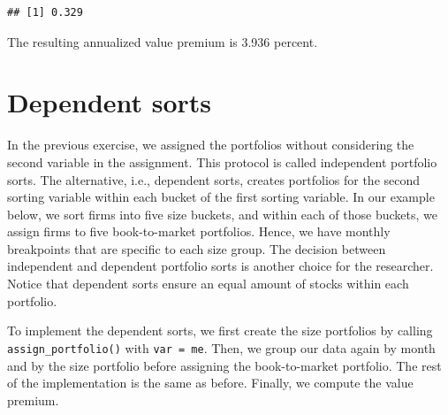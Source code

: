 \documentclass[
]{book}
\newenvironment{Shaded}{\begin{snugshade}}{\end{snugshade}}
\newcommand{\AttributeTok}[1]{\textcolor[rgb]{0.61,0.61,0.61}{#1}}
\newcommand{\DecValTok}[1]{\textcolor[rgb]{0.06,0.06,0.06}{#1}}
\newcommand{\ErrorTok}[1]{\textcolor[rgb]{0.14,0.14,0.14}{\textbf{#1}}}
\newcommand{\FunctionTok}[1]{\textcolor[rgb]{0,0,0}{#1}}
\newcommand{\NormalTok}[1]{#1}
\newcommand{\OtherTok}[1]{\textcolor[rgb]{0.37,0.37,0.37}{#1}}
\newcommand{\SpecialCharTok}[1]{\textcolor[rgb]{0,0,0}{#1}}
\newcommand{\StringTok}[1]{\textcolor[rgb]{0.5,0.5,0.5}{#1}}
\begin{document}
\begin{Shaded}
\end{Shaded}

\begin{verbatim}
## [1] 0.329
\end{verbatim}

The resulting annualized value premium is 3.936 percent.

\hypertarget{dependent-sorts}{%
\section{Dependent sorts}\label{dependent-sorts}}

In the previous exercise, we assigned the portfolios without considering the second variable in the assignment. This protocol is called independent portfolio sorts. The alternative, i.e., dependent sorts, creates portfolios for the second sorting variable within each bucket of the first sorting variable. In our example below, we sort firms into five size buckets, and within each of those buckets, we assign firms to five book-to-market portfolios. Hence, we have monthly breakpoints that are specific to each size group. The decision between independent and dependent portfolio sorts is another choice for the researcher. Notice that dependent sorts ensure an equal amount of stocks within each portfolio.

To implement the dependent sorts, we first create the size portfolios by calling \texttt{assign\_portfolio()} with \texttt{var\ =\ me}. Then, we group our data again by month and by the size portfolio before assigning the book-to-market portfolio. The rest of the implementation is the same as before. Finally, we compute the value premium.
\end{document}
